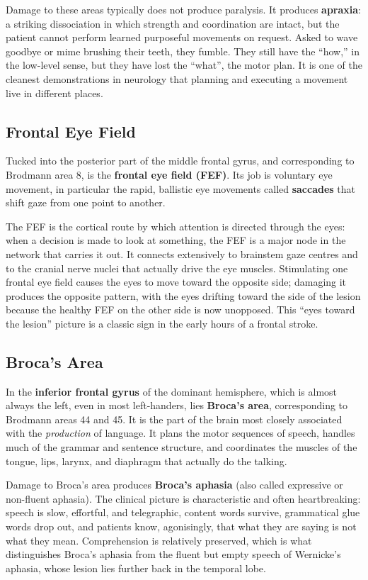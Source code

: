 \documentclass[11pt]{article}
\begin{document}
Damage to these areas typically does not produce paralysis. It produces \textbf{apraxia}: a striking dissociation in which strength and coordination are intact, but the patient cannot perform learned purposeful movements on request. Asked to wave goodbye or mime brushing their teeth, they fumble. They still have the ``how,'' in the low-level sense, but they have lost the ``what'', the motor plan. It is one of the cleanest demonstrations in neurology that planning and executing a movement live in different places.

\subsection{Frontal Eye Field}

Tucked into the posterior part of the middle frontal gyrus, and corresponding to Brodmann area 8, is the \textbf{frontal eye field (FEF)}. Its job is voluntary eye movement, in particular the rapid, ballistic eye movements called \textbf{saccades} that shift gaze from one point to another.

The FEF is the cortical route by which attention is directed through the eyes: when a decision is made to look at something, the FEF is a major node in the network that carries it out. It connects extensively to brainstem gaze centres and to the cranial nerve nuclei that actually drive the eye muscles. Stimulating one frontal eye field causes the eyes to move toward the opposite side; damaging it produces the opposite pattern, with the eyes drifting toward the side of the lesion because the healthy FEF on the other side is now unopposed. This ``eyes toward the lesion'' picture is a classic sign in the early hours of a frontal stroke.

\subsection{Broca's Area}

In the \textbf{inferior frontal gyrus} of the dominant hemisphere, which is almost always the left, even in most left-handers, lies \textbf{Broca's area}, corresponding to Brodmann areas 44 and 45. It is the part of the brain most closely associated with the \textit{production} of language. It plans the motor sequences of speech, handles much of the grammar and sentence structure, and coordinates the muscles of the tongue, lips, larynx, and diaphragm that actually do the talking.

Damage to Broca's area produces \textbf{Broca's aphasia} (also called expressive or non-fluent aphasia). The clinical picture is characteristic and often heartbreaking: speech is slow, effortful, and telegraphic, content words survive, grammatical glue words drop out, and patients know, agonisingly, that what they are saying is not what they mean. Comprehension is relatively preserved, which is what distinguishes Broca's aphasia from the fluent but empty speech of Wernicke's aphasia, whose lesion lies further back in the temporal lobe.
\end{document}
